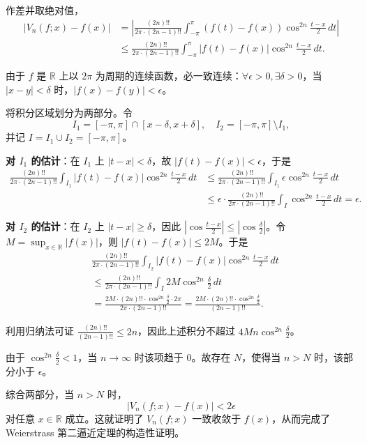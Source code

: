 作差并取绝对值，
\begin{align*}
|V_n(f;x) - f(x)|
&= \left| \frac{(2n)!!}{2\pi\cdot(2n-1)!!}\int_{-\pi}^{\pi} (f(t)-f(x))\cos^{2n}\frac{t-x}{2}\,dt \right| \\
&\leq \frac{(2n)!!}{2\pi\cdot(2n-1)!!}\int_{-\pi}^{\pi} |f(t)-f(x)|\cos^{2n}\frac{t-x}{2}\,dt.
\end{align*}

由于 $f$ 是 $\mathbb{R}$ 上以 $2\pi$ 为周期的连续函数，必一致连续：$\forall\epsilon>0,\exists\delta>0$，当 $|x-y|<\delta$ 时，$|f(x)-f(y)|<\epsilon$。

将积分区域划分为两部分。令
\[
I_1 = [-\pi,\pi] \cap [x-\delta, x+\delta],\quad
I_2 = [-\pi,\pi] \setminus I_1,
\]
并记 $I = I_1 \cup I_2 = [-\pi,\pi]$。

\textbf{对 $I_1$ 的估计}：在 $I_1$ 上 $|t-x|<\delta$，故 $|f(t)-f(x)|<\epsilon$，于是
\begin{align*}
\frac{(2n)!!}{2\pi\cdot(2n-1)!!}\int_{I_1} |f(t)-f(x)|\cos^{2n}\frac{t-x}{2}\,dt
&\leq \frac{(2n)!!}{2\pi\cdot(2n-1)!!}\int_{I_1} \epsilon\cos^{2n}\frac{t-x}{2}\,dt \\
&\leq \epsilon \cdot \frac{(2n)!!}{2\pi\cdot(2n-1)!!}\int_{I}\cos^{2n}\frac{t-x}{2}\,dt = \epsilon.
\end{align*}

\textbf{对 $I_2$ 的估计}：在 $I_2$ 上 $|t-x|\geq\delta$，因此 $\left|\cos\frac{t-x}{2}\right| \leq \left|\cos\frac{\delta}{2}\right|$。令 $M = \sup_{x\in\mathbb{R}}|f(x)|$，则 $|f(t)-f(x)|\leq 2M$。于是
\begin{align*}
&\frac{(2n)!!}{2\pi\cdot(2n-1)!!}\int_{I_2} |f(t)-f(x)|\cos^{2n}\frac{t-x}{2}\,dt \\
&\leq \frac{(2n)!!}{2\pi\cdot(2n-1)!!}\int_{I} 2M\cos^{2n}\frac{\delta}{2}\,dt \\
&= \frac{2M\cdot(2n)!!\cdot\cos^{2n}\frac{\delta}{2}\cdot 2\pi}{2\pi\cdot(2n-1)!!}
= \frac{2M\cdot(2n)!!\cdot\cos^{2n}\frac{\delta}{2}}{(2n-1)!!}.
\end{align*}

利用归纳法可证 $\frac{(2n)!!}{(2n-1)!!} \leq 2n$，因此上述积分不超过 $4Mn\cos^{2n}\frac{\delta}{2}$。

由于 $\cos^{2n}\frac{\delta}{2} < 1$，当 $n\to\infty$ 时该项趋于 $0$。故存在 $N$，使得当 $n>N$ 时，该部分小于 $\epsilon$。

综合两部分，当 $n>N$ 时，
\[
|V_n(f;x) - f(x)| < 2\epsilon
\]
对任意 $x\in\mathbb{R}$ 成立。这就证明了 $V_n(f;x)$ 一致收敛于 $f(x)$，从而完成了 Weierstrass 第二逼近定理的构造性证明。
